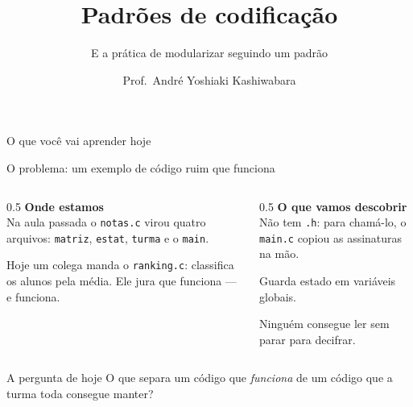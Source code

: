 \documentclass[aspectratio=169]{beamer}
\title{Padrões de codificação}
\subtitle{E a prática de modularizar seguindo um padrão}
\author{Prof.\ André Yoshiaki Kashiwabara}
\institute{DCOMP -- Universidade Federal de Sergipe\\
\texttt{andreyoshiaki@dcomp.ufs.br}}
\date{}
\begin{document}
\begin{frame}[plain]
  \titlepage
\end{frame}

\begin{frame}{O que você vai aprender hoje}
  \begin{center}
  \end{center}
\end{frame}

\begin{frame}{O problema: um exemplo de código ruim que funciona}
  \begin{columns}[T]
    \begin{column}{0.5\textwidth}
      \textbf{Onde estamos}\\[0.3em]
      Na aula passada o \texttt{notas.c} virou quatro arquivos:
      \texttt{matriz}, \texttt{estat}, \texttt{turma} e o \texttt{main}.

      \medskip
      Hoje um colega manda o \texttt{ranking.c}: classifica os alunos pela
      média. Ele jura que funciona --- e funciona.
    \end{column}
    \begin{column}{0.5\textwidth}
      \textbf{O que vamos descobrir}\\[0.3em]
      \textcolor{UFSRed}{Não tem \texttt{.h}:} para chamá-lo, o \texttt{main.c}
      copiou as assinaturas na mão.

      \medskip
      \textcolor{UFSRed}{Guarda estado em variáveis globais.}

      \medskip
      \textcolor{UFSRed}{Ninguém consegue ler} sem parar para decifrar.
    \end{column}
  \end{columns}
  \begin{block}{A pergunta de hoje}
    O que separa um código que \emph{funciona} de um código que a turma toda
    consegue manter?
  \end{block}
\end{frame}
\end{document}
